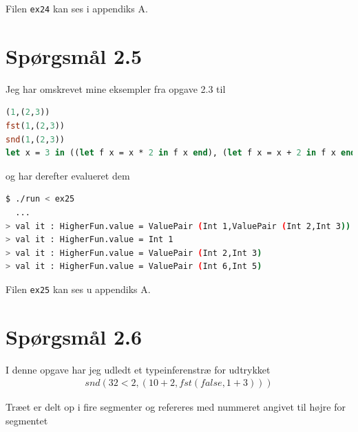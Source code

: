 \documentclass[danish,a4paper]{report}
\begin{document}
Filen \texttt{ex24} kan ses i appendiks A.

\section*{Spørgsmål 2.5}

Jeg har omskrevet mine eksempler fra opgave 2.3 til

\begin{lstlisting}[language=ML]
(1,(2,3))
fst(1,(2,3))
snd(1,(2,3))
let x = 3 in ((let f x = x * 2 in f x end), (let f x = x + 2 in f x end)) end
\end{lstlisting}

og har derefter evalueret dem

\begin{lstlisting}[language=bash]
$ ./run < ex25
  ...
> val it : HigherFun.value = ValuePair (Int 1,ValuePair (Int 2,Int 3))
> val it : HigherFun.value = Int 1
> val it : HigherFun.value = ValuePair (Int 2,Int 3)
> val it : HigherFun.value = ValuePair (Int 6,Int 5)
\end{lstlisting}

Filen \texttt{ex25} kan ses u appendiks A.

\section*{Spørgsmål 2.6}

I denne opgave har jeg udledt et typeinferenstræ for udtrykket 
\begin{align*}
snd(32 < 2, (10 + 2,fst(false,1+3)))
\end{align*}

Træet er delt op i fire segmenter og refereres med nummeret angivet til højre for segmentet
\end{document}
